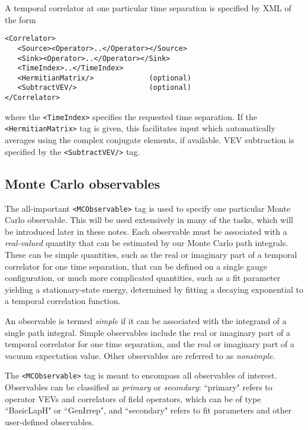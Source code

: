 \documentclass[12pt]{article}
\newcommand{\vb}{\texttt}
\begin{document}
A temporal correlator at one particular time separation is specified
by XML of the form
\begin{verbatim}
<Correlator>
   <Source><Operator>..</Operator></Source>
   <Sink><Operator>..</Operator></Sink>
   <TimeIndex>..</TimeIndex>
   <HermitianMatrix/>             (optional)
   <SubtractVEV/>                 (optional)
</Correlator>
\end{verbatim}
where the \vb{<TimeIndex>} specifies the requested time separation.
If the \vb{<HermitianMatrix>} tag is given, this facilitates
input which automatically averages using the complex conjugate
elements, if available.  VEV subtraction is specified by the
\vb{<SubtractVEV/>} tag.

\subsection{Monte Carlo observables}

The all-important \vb{<MCObservable>} tag is used to specify one particular
Monte Carlo observable. This will be used extensively in many
of the tasks, which will be introduced later in these notes.
Each observable must be associated with a \textit{real-valued} 
quantity that can be estimated by our Monte Carlo path integrals. 
These can be simple quantities, such as the real or imaginary part of
a temporal correlator for one time separation, that can be
defined on a single gauge configuration, or much more
complicated quantities, such as a fit parameter yielding a
stationary-state energy, determined by fitting a decaying
exponential to a temporal correlation function.

An observable is termed \textit{simple} if it can be associated with
the integrand of a single path integral.  Simple observables include
the real or imaginary part of a temporal correlator
for one time separation, and the real or imaginary part of a vacuum 
expectation value.  Other observables are referred to as \textit{nonsimple}.

The \vb{<MCObservable>} tag is meant to encompass all observables
of interest.  Observables can be classified as \textit{primary} or
\textit{secondary}:  ``primary" refers to operator VEVs and correlators of 
field operators, which can be of type ``BasicLapH" or ``GenIrrep", and
``secondary" refers to fit parameters and other user-defined 
observables.
\end{document}

